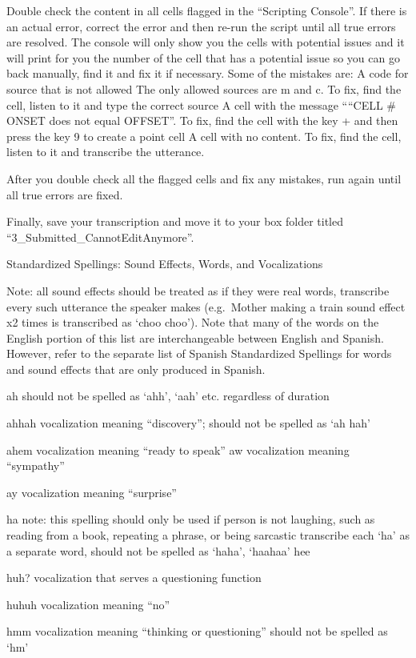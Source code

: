 \documentclass[
]{book}
\begin{document}
Double check the content in all cells flagged in the ``Scripting Console''. If there is an actual error, correct the error and then re-run the script until all true errors are resolved. The console will only show you the cells with potential issues and it will print for you the number of the cell that has a potential issue so you can go back manually, find it and fix it if necessary. Some of the mistakes are:
A code for source that is not allowed
The only allowed sources are m and c.
To fix, find the cell, listen to it and type the correct source
A cell with the message ````CELL \# ONSET does not equal OFFSET''. To fix, find the cell with the key + and then press the key 9 to create a point cell
A cell with no content. To fix, find the cell, listen to it and transcribe the utterance.

After you double check all the flagged cells and fix any mistakes, run again until all true errors are fixed.

Finally, save your transcription and move it to your box folder titled ``3\_Submitted\_CannotEditAnymore''.

Standardized Spellings: Sound Effects, Words, and Vocalizations

Note: all sound effects should be treated as if they were real words, transcribe every such utterance the speaker makes (e.g.~Mother making a train sound effect x2 times is transcribed as `choo choo'). Note that many of the words on the English portion of this list are interchangeable between English and Spanish. However, refer to the separate list of Spanish Standardized Spellings for words and sound effects that are only produced in Spanish.

ah
should not be spelled as `ahh', `aah' etc. regardless of duration

ahhah
vocalization meaning ``discovery''; should not be spelled as `ah hah'

ahem
vocalization meaning ``ready to speak''
aw
vocalization meaning ``sympathy''

ay
vocalization meaning ``surprise''

ha
note: this spelling should only be used if person is not laughing, such as reading from a book, repeating a phrase, or being sarcastic
transcribe each `ha' as a separate word, should not be spelled as `haha', `haahaa'
hee

huh?
vocalization that serves a questioning function

huhuh
vocalization meaning ``no''

hmm
vocalization meaning ``thinking or questioning''
should not be spelled as `hm'
\end{document}
